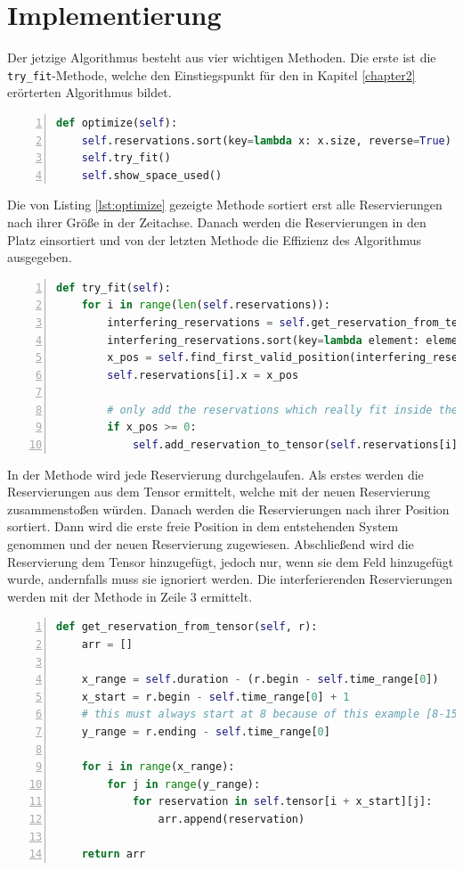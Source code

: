 \chapter{Implementierung}
Der jetzige Algorithmus besteht aus vier wichtigen Methoden. Die erste ist die \texttt{try\_fit}-Methode, welche den Einstiegspunkt für den in Kapitel \ref{chapter2} erörterten Algorithmus bildet.
\begin{lstlisting}[language=python,caption={Einstiegspunkt},captionpos=b,label={lst:optimize},escapechar=|,numbers=left]
def optimize(self):
    self.reservations.sort(key=lambda x: x.size, reverse=True)  # sort reservations after size
    self.try_fit()
    self.show_space_used()
\end{lstlisting}
Die von Listing \ref{lst:optimize} gezeigte Methode sortiert erst alle Reservierungen nach ihrer Größe in der Zeitachse. Danach werden die Reservierungen in den Platz einsortiert und von der letzten Methode die Effizienz des Algorithmus ausgegeben.
\begin{lstlisting}[language=python,caption={try\_fit-Methode},captionpos=b,label={lst:tryfit},escapechar=|,numbers=left]
def try_fit(self):
    for i in range(len(self.reservations)):
        interfering_reservations = self.get_reservation_from_tensor(self.reservations[i])
        interfering_reservations.sort(key=lambda element: element.x, reverse=False)  # sort the reservations after x position |\label{tfm:4}|
        x_pos = self.find_first_valid_position(interfering_reservations, self.reservations[i]) |\label{tfm:5}|
        self.reservations[i].x = x_pos

        # only add the reservations which really fit inside the available space
        if x_pos >= 0:
            self.add_reservation_to_tensor(self.reservations[i])
\end{lstlisting}
In der Methode wird jede Reservierung durchgelaufen. Als erstes werden die Reservierungen aus dem Tensor ermittelt, welche mit der neuen Reservierung zusammenstoßen würden. Danach werden die Reservierungen nach ihrer Position sortiert. Dann wird die erste freie Position in dem entstehenden System genommen und der neuen Reservierung zugewiesen. Abschließend wird die Reservierung dem Tensor hinzugefügt, jedoch nur, wenn sie dem Feld hinzugefügt wurde, andernfalls muss sie ignoriert werden. Die interferierenden Reservierungen werden mit der Methode in Zeile 3 ermittelt.
\newpage
\begin{lstlisting}[language=python,caption={get\_reservation\_from\_tensor-Methode},captionpos=b,label={lst:grft},escapechar=|,numbers=left]
def get_reservation_from_tensor(self, r):
    arr = []

    x_range = self.duration - (r.begin - self.time_range[0])
    x_start = r.begin - self.time_range[0] + 1
    # this must always start at 8 because of this example [8-15] and [9-10] 1 interferes with 2
    y_range = r.ending - self.time_range[0]

    for i in range(x_range):
        for j in range(y_range):
            for reservation in self.tensor[i + x_start][j]:
                arr.append(reservation)

    return arr
\end{lstlisting}
